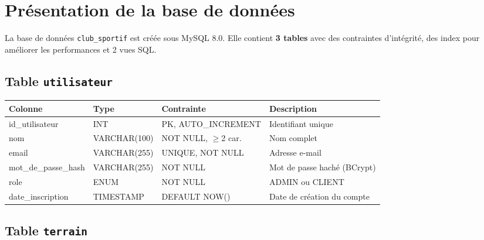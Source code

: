 \documentclass[12pt, a4paper]{report}
\begin{document}
\section{Présentation de la base de données}

La base de données \texttt{club\_sportif} est créée sous MySQL 8.0. Elle
contient \textbf{3 tables} avec des contraintes d'intégrité, des index
pour améliorer les performances et 2 vues SQL.

\subsection{Table \texttt{utilisateur}}

\begin{center}
\begin{tabular}{>{\ttfamily\small}l >{\ttfamily\small}l >{\small}l >{\small}l}
\toprule
\normalfont Colonne & \normalfont Type & Contrainte & Description \\
\midrule
id\_utilisateur      & INT            & PK, AUTO\_INCREMENT & Identifiant unique \\
nom                  & VARCHAR(100)   & NOT NULL, $\geq$2 car. & Nom complet \\
email                & VARCHAR(255)   & UNIQUE, NOT NULL   & Adresse e-mail \\
mot\_de\_passe\_hash & VARCHAR(255)   & NOT NULL           & Mot de passe haché (BCrypt) \\
role                 & ENUM           & NOT NULL           & ADMIN ou CLIENT \\
date\_inscription    & TIMESTAMP      & DEFAULT NOW()      & Date de création du compte \\
\bottomrule
\end{tabular}
\end{center}

\subsection{Table \texttt{terrain}}
\end{document}
